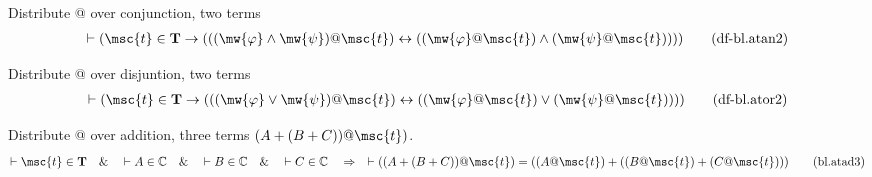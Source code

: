 \begin{metadefinition} Distribute @ over conjunction, two
terms
\begin{align}
\vdash ( \msc{t} \in \mathbf{T} \rightarrow ( ( ( \mw{\varphi} \wedge \mw{\psi}
    ) @ \msc{t} ) \leftrightarrow ( ( \mw{\varphi} @ \msc{t} ) \wedge (
    \mw{\psi} @ \msc{t} ) ) ) )\label{eq:df-bl.atan2}\tag{df-bl.atan2}
\end{align}
\end{metadefinition}

\begin{metadefinition} Distribute @ over disjuntion, two
terms
\begin{align}
\vdash ( \msc{t} \in \mathbf{T} \rightarrow ( ( ( \mw{\varphi} \vee \mw{\psi} )
    @ \msc{t} ) \leftrightarrow ( ( \mw{\varphi} @ \msc{t} ) \vee ( \mw{\psi} @
    \msc{t} ) ) ) )\label{eq:df-bl.ator2}\tag{df-bl.ator2}
\end{align}
\end{metadefinition}

\begin{lemma} Distribute @ over addition, three terms $(
A + ( B + C ) ) @ \msc{t} )$.
\begin{align}
\vdash \msc{t} \in \mathbf{T}\quad\&\quad \vdash A \in \mathbb{C}\quad\&\quad
    \vdash B \in \mathbb{C}\quad\&\quad \vdash C \in
    \mathbb{C}\quad\Rightarrow\quad \vdash ( ( A + ( B + C ) ) @ \msc{t} ) = (
    ( A @ \msc{t} ) + ( ( B @ \msc{t} ) + ( C @ \msc{t} ) )
    )\label{eq:bl.atad3}\tag{bl.atad3}
\end{align}
\end{lemma}

